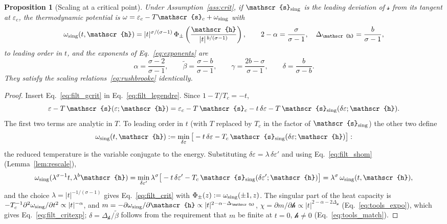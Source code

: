 \documentclass[10pt,a4paper]{article}
\theoremstyle{plain}
\newtheorem{proposition}{Proposition}
\newcommand{\hfield}{\mathscr{h}}  %
\newcommand{\lds}{\mathscr{s}}  %
\begin{document}
\begin{proposition}[Scaling at a critical point]\label{prop:crit}
Under Assumption~\ref{ass:crit}, if $\lds_{\rm sing}$ is the leading
deviation of $\lds$ from its tangent at $\varepsilon_c$, the thermodynamic
potential is $\omega=\varepsilon_c-T\lds_c+\omega_{\rm sing}$ with
\begin{equation}\label{eq:filt_crit}
  \omega_{\rm sing}(t,\hfield)=|t|^{\sigma/(\sigma-1)}\,
  \Phi_\pm\left(\frac{\hfield}{|t|^{\,b/(\sigma-1)}}\right),
  \qquad
  2-\alpha=\frac{\sigma}{\sigma-1} ,\quad \Delta_\hfield=\frac{b}{\sigma-1} ,
\end{equation}
to leading order in $t$, and the exponents of Eq.~\eqref{eq:exponents} are
\begin{equation}\label{eq:filt_critexp}
  \alpha=\frac{\sigma-2}{\sigma-1} ,\qquad
  \tilde\beta=\frac{\sigma-b}{\sigma-1} ,\qquad
  \gamma=\frac{2b-\sigma}{\sigma-1} ,\qquad
  \delta=\frac{b}{\sigma-b} .
\end{equation}
They satisfy the scaling relations~\eqref{eq:rushbrooke} identically.
\end{proposition}
\begin{proof}
Insert Eq.~\eqref{eq:filt_gcrit} in Eq.~\eqref{eq:filt_legendre}. Since
$1-T/T_c=-t$,
\[
  \varepsilon-T\,\lds(\varepsilon;\hfield)
  =\varepsilon_c-T\,\lds_c-t\,\delta\varepsilon-T\,\lds_{\rm sing}(\delta\varepsilon;\hfield) .
\]
The first two terms are analytic in $T$. To leading order in $t$ (with $T$
replaced by $T_c$ in the factor of $\lds_{\rm sing}$) the other two define
\begin{equation}\label{eq:filt_omsing}
  \omega_{\rm sing}(t,\hfield):=\min_{\delta\varepsilon}
  \big[-t\,\delta\varepsilon-T_c\,\lds_{\rm sing}(\delta\varepsilon;\hfield)\big] :
\end{equation}
the reduced temperature is the variable conjugate to the energy.
Substituting $\delta\varepsilon=\lambda\,\delta\varepsilon'$ and using
Eq.~\eqref{eq:filt_shom} (Lemma~\ref{lem:rescale}),
\[
  \omega_{\rm sing}(\lambda^{\sigma-1}t,\lambda^{b}\hfield)
  =\min_{\delta\varepsilon'}\lambda^{\sigma}
  \big[-t\,\delta\varepsilon'-T_c\,\lds_{\rm sing}(\delta\varepsilon';\hfield)\big]
  =\lambda^{\sigma}\,\omega_{\rm sing}(t,\hfield) ,
\]
and the choice $\lambda=|t|^{-1/(\sigma-1)}$ gives Eq.~\eqref{eq:filt_crit}
with $\Phi_\pm(z):=\omega_{\rm sing}(\pm1,z)$. The singular part of the heat
capacity is
$-T_c^{-1}\partial^{2}\omega_{\rm sing}/\partial t^{2}\propto|t|^{-\alpha}$,
and $m=-\partial\omega_{\rm sing}/\partial \hfield\propto|t|^{2-\alpha-\Delta_\hfield}$,
$\chi=\partial m/\partial \hfield\propto|t|^{2-\alpha-2\Delta_\hfield}$
(Eq.~\eqref{eq:tools_expo}), which gives Eq.~\eqref{eq:filt_critexp};
$\delta=\Delta_\hfield/\tilde\beta$ follows from the requirement that $m$ be
finite at $t=0$, $\hfield\neq0$ (Eq.~\eqref{eq:tools_match}).
\end{proof}
\end{document}
